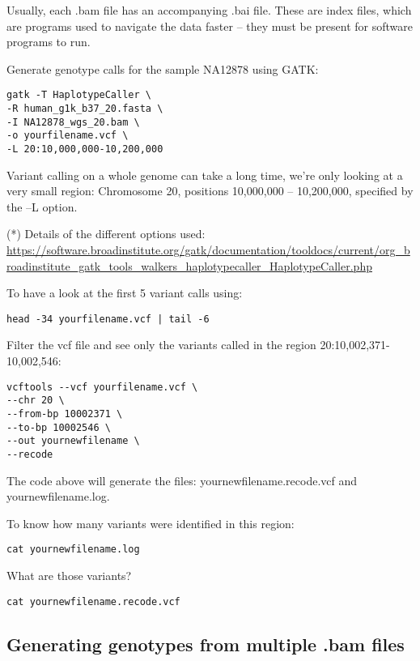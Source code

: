 \documentclass[]{book}
\begin{document}
Usually, each .bam file has an accompanying .bai file. These are index
files, which are programs used to navigate the data faster -- they must
be present for software programs to run.

Generate genotype calls for the sample NA12878 using GATK:

\begin{verbatim}
gatk -T HaplotypeCaller \
-R human_g1k_b37_20.fasta \
-I NA12878_wgs_20.bam \
-o yourfilename.vcf \
-L 20:10,000,000-10,200,000
\end{verbatim}

Variant calling on a whole genome can take a long time, we're only
looking at a very small region: Chromosome 20, positions 10,000,000 --
10,200,000, specified by the --L option.

(*) Details of the different options used:
\url{https://software.broadinstitute.org/gatk/documentation/tooldocs/current/org_broadinstitute_gatk_tools_walkers_haplotypecaller_HaplotypeCaller.php}

To have a look at the first 5 variant calls using:

\begin{verbatim}
head -34 yourfilename.vcf | tail -6
\end{verbatim}

Filter the vcf file and see only the variants called in the region
20:10,002,371-10,002,546:

\begin{verbatim}
vcftools --vcf yourfilename.vcf \
--chr 20 \
--from-bp 10002371 \
--to-bp 10002546 \
--out yournewfilename \
--recode
\end{verbatim}

The code above will generate the files: yournewfilename.recode.vcf and
yournewfilename.log.

To know how many variants were identified in this region:

\begin{verbatim}
cat yournewfilename.log
\end{verbatim}

What are those variants?

\begin{verbatim}
cat yournewfilename.recode.vcf
\end{verbatim}

\subsection{Generating genotypes from multiple .bam
files}\label{generating-genotypes-from-multiple-.bam-files}
\end{document}
